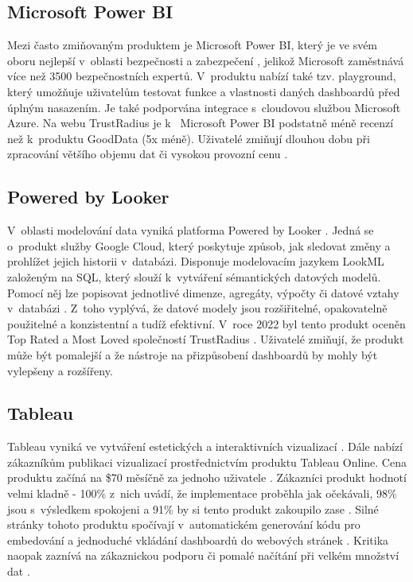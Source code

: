 \documentclass[czech, bc, kiv, he, iso690numb]{fasthesis}
\begin{document}
\subsection{Microsoft Power BI}
Mezi často zmiňovaným produktem je Microsoft Power BI, který je ve svém oboru nejlepší v~oblasti bezpečnosti a zabezpečení \cite{bestEmbTools2023},
jelikož Microsoft zaměstnává více než 3500 bezpečnostních expertů. V~produktu nabízí také tzv. playground, který
umožňuje uživatelům testovat funkce a vlastnosti daných dashboardů před úplným nasazením. Je také podporvána integrace s~cloudovou službou Microsoft Azure. Na webu TrustRadius je k~
Microsoft Power BI podstatně méně recenzí než k~produktu GoodData (5x méně). Uživatelé zmiňují dlouhou dobu při zpracování většího objemu dat či vysokou provozní cenu \cite{trustRadiusDiscusionAzure}.

\subsection{Powered by Looker}
V~oblasti modelování data vyniká platforma Powered by Looker \cite{bestEmbTools2023}. Jedná se o~produkt služby Google Cloud, který poskytuje způsob, jak sledovat změny a prohlížet jejich
historii v~databázi. Disponuje modelovacím jazykem LookML založeným na SQL, který slouží k~vytváření sémantických datových modelů. Pomocí něj lze popisovat jednotlivé dimenze, agregáty,
výpočty či datové vztahy v~databázi \cite{googleLookMLDoc}. Z~toho vyplývá, že datové modely jsou rozšiřitelné, opakovatelně použitelné a konzistentní a tudíž efektivní. V~roce 2022 byl tento produkt
oceněn Top Rated a Most Loved společností TrustRadius \cite{trustRadiusDiscusionLooker}. Uživatelé zmiňují, že produkt může být pomalejší a že nástroje na přizpůsobení dashboardů by mohly být
vylepšeny a rozšířeny.


\subsection{Tableau}
Tableau vyniká ve vytváření estetických a interaktivních vizualizací \cite{tableauBlog}. Dále nabízí zákazníkům publikaci vizualizací prostřednictvím produktu Tableau Online. Cena produktu začíná na \$70 měsíčně za jednoho uživatele \cite{trustRadiusTableAU}. 
Zákazníci produkt hodnotí velmi kladně - 100\% z~nich uvádí, že implementace proběhla jak očekávali, 98\% jsou s~výsledkem spokojeni a 91\% by si tento produkt zakoupilo zase \cite{trustRadiusTableAU}. Silné stránky 
tohoto produktu spočívají v~automatickém generování kódu pro embedování a jednoduché vkládání dashboardů do webových stránek \cite{tableauBlog}. Kritika naopak zaznívá na zákaznickou podporu či pomalé načítání při velkém množství dat \cite{trustRadiusTableAU}.
\end{document}
